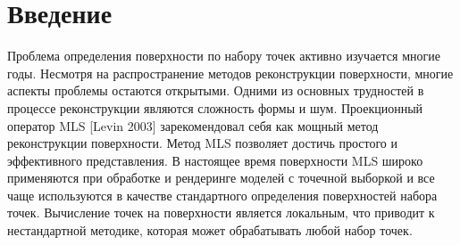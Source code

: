 \section*{Введение} 
Проблема определения поверхности по набору точек активно изучается многие годы. Несмотря на распространение методов реконструкции поверхности, многие аспекты проблемы остаются открытыми. Одними из основных трудностей в процессе реконструкции являются сложность формы и шум.  Проекционный оператор MLS [Levin 2003] зарекомендовал себя как мощный метод реконструкции поверхности. 
Метод MLS позволяет достичь простого и эффективного представления. В настоящее время поверхности MLS широко применяются при обработке и рендеринге моделей с точечной выборкой и все чаще используются в качестве стандартного определения поверхностей набора точек.  Вычисление точек на поверхности является локальным, что приводит к нестандартной методике, которая может обрабатывать любой набор точек. ~\cite{Sidelnikov1}




